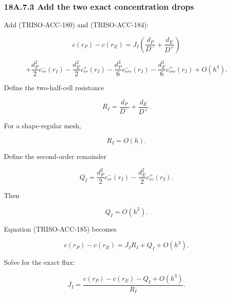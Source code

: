 \documentclass[11pt,a4paper]{article}
\begin{document}
\subsubsection*{18A.7.3 Add the two exact concentration drops}

Add (TRISO-ACC-180) and (TRISO-ACC-184):

\begin{equation}
c(r_P)-c(r_E)
=
J_I
\left(
\frac{d_P}{D^-}
+
\frac{d_E}{D^+}
\right)
\end{equation}

\begin{equation}
+
\frac{d_P^2}{2}c_{rr}^-(r_I)
-
\frac{d_E^2}{2}c_{rr}^+(r_I)
-
\frac{d_P^3}{6}c_{rrr}^-(r_I)
-
\frac{d_E^3}{6}c_{rrr}^+(r_I)
+
O(h^4).
\tag{TRISO-ACC-185}
\label{eq:triso-acc-185}
\end{equation}

Define the two-half-cell resistance

\begin{equation}
\boxed{
R_I
=
\frac{d_P}{D^-}
+
\frac{d_E}{D^+}.
}
\tag{TRISO-ACC-186}
\label{eq:triso-acc-186}
\end{equation}

For a shape-regular mesh,

\begin{equation}
R_I=O(h).
\tag{TRISO-ACC-187}
\label{eq:triso-acc-187}
\end{equation}

Define the second-order remainder

\begin{equation}
Q_I
=
\frac{d_P^2}{2}c_{rr}^-(r_I)
-
\frac{d_E^2}{2}c_{rr}^+(r_I).
\tag{TRISO-ACC-188}
\label{eq:triso-acc-188}
\end{equation}

Then

\begin{equation}
Q_I=O(h^2).
\tag{TRISO-ACC-189}
\label{eq:triso-acc-189}
\end{equation}

Equation (TRISO-ACC-185) becomes

\begin{equation}
c(r_P)-c(r_E)
=
J_IR_I
+
Q_I
+
O(h^3).
\tag{TRISO-ACC-190}
\label{eq:triso-acc-190}
\end{equation}

Solve for the exact flux:

\begin{equation}
J_I
=
\frac{
c(r_P)-c(r_E)-Q_I+O(h^3)
}{
R_I
}.
\tag{TRISO-ACC-191}
\label{eq:triso-acc-191}
\end{equation}
\end{document}
